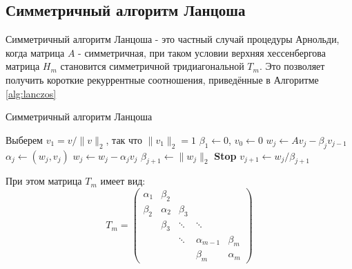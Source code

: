 \subsection[Симметричный алгоритм Ланцоша]{Симметричный алгоритм Ланцоша \cite{Saad2003}}
Симметричный алгоритм Ланцоша - это частный случай процедуры Арнольди, когда матрица 
$A$ - симметричная, при таком условии верхняя хессенбергова матрица $H_m$ становится симметричной
тридиагональной $T_m$. Это позволяет получить короткие рекуррентные соотношения, 
приведённые в Алгоритме \ref{alg:lanczos} 
\begin{algorithm}[H]
    \caption{Симметричный алгоритм Ланцоша}\label{alg:lanczos}
    \begin{algorithmic}[1]
    \State Выберем $v_1 = v / \|v\|_2$, так что $\|v_1\|_2 = 1$
    \State $\beta_1 \gets 0$, $v_0 \gets 0$
        \State $w_j \gets Av_j - \beta_j v_{j-1}$
        \State $\alpha_j \gets (w_j, v_j)$
        \State $w_j \gets w_j - \alpha_j v_j$
        \State $\beta_{j+1} \gets \|w_j\|_2$
            \State \textbf{Stop}
        \EndIf
        \State $v_{j+1} \gets w_j / \beta_{j+1}$
    \EndFor
    \end{algorithmic}
    \end{algorithm} 

При этом матрица $T_m$ имеет вид: 
\begin{equation}
T_m = \begin{pmatrix}
\alpha_1 & \beta_2 & & & \\
\beta_2 & \alpha_2 & \beta_3 & & \\
& \beta_3 & \ddots & \ddots & \\
& & \ddots & \alpha_{m-1} & \beta_m \\
& & & \beta_m & \alpha_m
\end{pmatrix}
\label{eq:T_m}
\end{equation}

